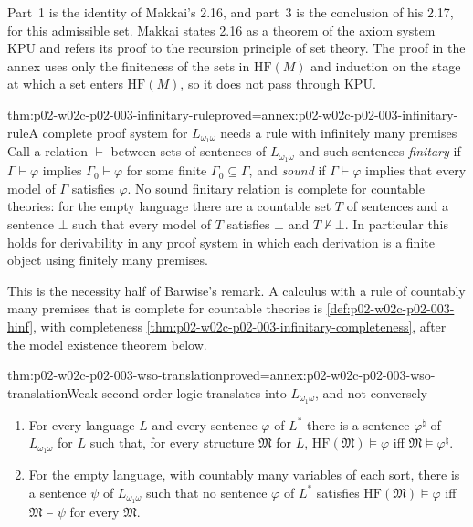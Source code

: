 Part~1 is the identity of Makkai's 2.16, and part~3 is the conclusion of
his 2.17, for this admissible set.  Makkai states 2.16 as a theorem of the
axiom system \(\mathrm{KPU}\) and refers its proof to the recursion
principle of set theory.  The proof in the annex uses only the finiteness
of the sets in \(\mathrm{HF}(M)\) and induction on the stage at which a set
enters \(\mathrm{HF}(M)\), so it does not pass through \(\mathrm{KPU}\).

\begin{hbtheorem}{thm:p02-w02c-p02-003-infinitary-rule}{proved=annex:p02-w02c-p02-003-infinitary-rule}{A complete proof system for \(L_{\omega_1\omega}\) needs a rule with infinitely many premises}
Call a relation \(\vdash\) between sets of sentences of
\(L_{\omega_1\omega}\) and such sentences \emph{finitary} if
\(\Gamma\vdash\varphi\) implies \(\Gamma_0\vdash\varphi\) for some finite
\(\Gamma_0\subseteq\Gamma\), and \emph{sound} if \(\Gamma\vdash\varphi\)
implies that every model of \(\Gamma\) satisfies \(\varphi\).  No sound
finitary relation is complete for countable theories: for the empty
language there are a countable set \(T\) of sentences and a sentence
\(\bot\) such that every model of \(T\) satisfies \(\bot\) and
\(T\nvdash\bot\).  In particular this holds for derivability in any proof
system in which each derivation is a finite object using finitely many
premises.
\end{hbtheorem}

This is the necessity half of Barwise's remark.  A calculus with a rule of
countably many premises that is complete for countable theories is
\cref{def:p02-w02c-p02-003-hinf}, with completeness
\cref{thm:p02-w02c-p02-003-infinitary-completeness}, after the model
existence theorem below.

\begin{hbtheorem}{thm:p02-w02c-p02-003-wso-translation}{proved=annex:p02-w02c-p02-003-wso-translation}{Weak second-order logic translates into \(L_{\omega_1\omega}\), and not conversely}
\begin{enumerate}
\item For every language \(L\) and every sentence \(\varphi\) of
      \(L^{*}\) there is a sentence \(\varphi^{\natural}\) of
      \(L_{\omega_1\omega}\) for \(L\) such that, for every structure
      \(\mathfrak M\) for \(L\), \(\mathrm{HF}(\mathfrak M)\models\varphi\)
      iff \(\mathfrak M\models\varphi^{\natural}\).
\item For the empty language, with countably many variables of each
      sort, there is a sentence \(\psi\) of \(L_{\omega_1\omega}\) such that
      no sentence \(\varphi\) of \(L^{*}\) satisfies
      \(\mathrm{HF}(\mathfrak M)\models\varphi\) iff
      \(\mathfrak M\models\psi\) for every \(\mathfrak M\).
\end{enumerate}
\end{hbtheorem}

